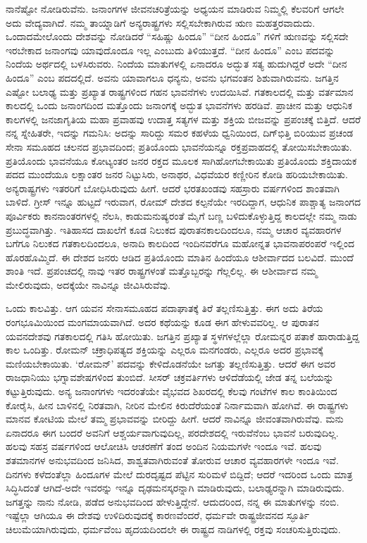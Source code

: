 ನಾನೆಷ್ಟೋ ನೋಡಿರುವೆನು. ಜನಾಂಗಗಳ ಜೀವನಚರಿತ್ರೆಯನ್ನು ಅಧ್ಯಯನ ಮಾಡಿರುವ ನಿಮ್ಮಲ್ಲಿ ಕೆಲವರಿಗೆ ಆಗಲೇ ಅದು ವೇದ್ಯವಾಗಿದೆ. ನಮ್ಮ ತಾಯ್ನಾಡಿಗೆ ಅನ್ಯರಾಷ್ಟ್ರಗಳು ಸಲ್ಲಿಸಬೇಕಾಗಿರುವ ಋಣ ಮಹತ್ತರವಾದುದು. ಒಂದಾದಮೇಲೊಂದು ದೇಶವನ್ನು ನೋಡಿದರೆ “ಸಹಿಷ್ಣು ಹಿಂದೂ” “ದೀನ ಹಿಂದೂ” ಗಳಿಗೆ ಋಣವನ್ನು ಸಲ್ಲಿಸದೇ ಇರಬೇಕಾದ ಜನಾಂಗವು ಯಾವುದೊಂದೂ ಇಲ್ಲ ಎಂಬುದು ತಿಳಿಯುತ್ತದೆ. “ದೀನ ಹಿಂದೂ” ಎಂಬ ಪದವನ್ನು ನಿಂದೆಯ ಅರ್ಥದಲ್ಲಿ ಬಳಸಿರುವರು. ನಿಂದೆಯ ಮಾತುಗಳಲ್ಲಿ ಏನಾದರೂ ಅದ್ಭುತ ಸತ್ಯ ಹುದುಗಿದ್ದರೆ ಅದೇ “ದೀನ ಹಿಂದೂ” ಎಂಬ ಪದದಲ್ಲಿದೆ. ಅವನು ಯಾವಾಗಲೂ ಧನ್ಯನು, ಅವನು ಭಗವಂತನ ಶಿಶುವಾಗಿರುವನು. ಜಗತ್ತಿನ ಎಷ್ಟೋ ಬಲಾಢ್ಯ ಮತ್ತು ಪ್ರಖ್ಯಾತ ರಾಷ್ಟ್ರಗಳಿಂದ ಗಹನ ಭಾವನೆಗಳು ಉದಯಿಸಿವೆ. ಗತಕಾಲದಲ್ಲಿ ಮತ್ತು ವರ್ತಮಾನ ಕಾಲದಲ್ಲಿ ಒಂದು ಜನಾಂಗದಿಂದ ಮತ್ತೊಂದು ಜನಾಂಗಕ್ಕೆ ಅದ್ಭುತ ಭಾವನೆಗಳು ಹರಡಿವೆ. ಪ್ರಾಚೀನ ಮತ್ತು ಆಧುನಿಕ ಕಾಲಗಳಲ್ಲಿ ಜನಜಾಗೃತಿಯ ಮಹಾ ಪ್ರವಾಹವು ಉದಾತ್ತ ಸತ್ಯಗಳ ಮತ್ತು ಶಕ್ತಿಯ ಬೀಜವನ್ನು ಪ್ರಪಂಚಕ್ಕೆ ಬಿತ್ತಿದೆ. ಆದರೆ ನನ್ನ ಸ್ನೇಹಿತರೇ, ಇದನ್ನು ಗಮನಿಸಿ: ಅದನ್ನು ಸಾರಿದ್ದು ಸಮರ ಕಹಳೆಯ ಧ್ವನಿಯಿಂದ, ದಿಗ್​ಭಿತ್ತಿ ಬಿರಿಯುವ ಪ್ರಚಂಡ ಸೇನಾ ಸಮೂಹದ ಚಲನದ ಪ್ರಭಾವದಿಂದ; ಪ್ರತಿಯೊಂದು ಭಾವನೆಯನ್ನೂ ರಕ್ತಪ್ರವಾಹದಲ್ಲಿ ತೋಯಿಸಬೇಕಾಯಿತು. ಪ್ರತಿಯೊಂದು ಭಾವನೆಯೂ ಕೋಟ್ಯಂತರ ಜನರ ರಕ್ತದ ಮೂಲಕ ಸಾಗಿಹೋಗಬೇಕಾಯಿತು ಪ್ರತಿಯೊಂದು ಶಕ್ತಿದಾಯಕ ಪದದ ಮುಂದೆಯೂ ಲಕ್ಷಾಂತರ ಜನರ ನಿಟ್ಟುಸಿರು, ಅನಾಥರ, ವಿಧವೆಯರ ಕಣ್ಣೀರಿನ ಕೋಡಿ ಹರಿಯಬೇಕಾಯಿತು. ಅನ್ಯರಾಷ್ಟ್ರಗಳು ಇತರರಿಗೆ ಬೋಧಿಸಿರುವುದು ಹೀಗೆ. ಆದರೆ ಭರತಖಂಡವು ಸಹಸ್ರಾರು ವರ್ಷಗಳಿಂದ ಶಾಂತವಾಗಿ ಬಾಳಿದೆ. ಗ್ರೀಸ್​ ಇನ್ನೂ ಹುಟ್ಟದೆ ಇರುವಾಗ, ರೋಮ್​ ದೇಶದ ಕಲ್ಪನೆಯೇ ಇರದಿದ್ದಾಗ, ಆಧುನಿಕ ಪಾಶ್ಚಾತ್ಯ ಜನಾಂಗದ ಪೂರ್ವಿಕರು ಕಾನನಾಂತರಗಳಲ್ಲಿ ನೆಲಸಿ, ಕಾಡುಮನುಷ್ಯರಂತೆ ಮೈಗೆ ಬಣ್ಣ ಬಳಿದುಕೊಳ್ಳುತ್ತಿದ್ದ ಕಾಲದಲ್ಲೇ ನಮ್ಮ ನಾಡು ಪ್ರಬುದ್ಧವಾಗಿತ್ತು. ಇತಿಹಾಸದ ದಾಖಲೆಗೆ ಕೂಡ ನಿಲುಕದ ಪುರಾತನಕಾಲದಿಂದಲೂ, ನಮ್ಮ ಆಚಾರ ವ್ಯವಹಾರಗಳ ಬಗೆಗೂ ನಿಲುಕದ ಗತಕಾಲದಿಂದಲೂ, ಅನಾದಿ ಕಾಲದಿಂದ ಇಂದಿನವರೆಗೂ ಮಹೋನ್ನತ ಭಾವನಾಪರಂಪರೆ ಇಲ್ಲಿಂದ ಹೊರಹೊಮ್ಮಿದೆ. ಈ ದೇಶದ ಜನರು ಆಡಿದ ಪ್ರತಿಯೊಂದು ಮಾತಿನ ಹಿಂದೆಯೂ ಆಶೀರ್ವಾದದ ಬಲವಿದೆ. ಮುಂದೆ ಶಾಂತಿ ಇದೆ. ಪ್ರಪಂಚದಲ್ಲಿ ನಾವು ಇತರ ರಾಷ್ಟ್ರಗಳಂತೆ ಮತ್ತೊಬ್ಬರನ್ನು ಗೆಲ್ಲಲಿಲ್ಲ. ಈ ಆಶೀರ್ವಾದ ನಮ್ಮ ಮೇಲಿರುವುದು, ಅದಕ್ಕೆಯೇ ನಾವಿನ್ನೂ ಜೀವಿಸಿರುವೆವು.

ಒಂದು ಕಾಲವಿತ್ತು. ಆಗ ಯವನ ಸೇನಾಸಮೂಹದ ಪದಾಘಾತಕ್ಕೆ ತಿರೆ ತಲ್ಲಣಿಸುತ್ತಿತ್ತು. ಈಗ ಅದು ತಿರೆಯ ರಂಗಭೂಮಿಯಿಂದ ಮಂಗಮಾಯವಾಗಿದೆ. ಅದರ ಕಥೆಯನ್ನು ಕೂಡ ಈಗ ಹೇಳುವವರಿಲ್ಲ. ಆ ಪುರಾತನ ಯವನದೇಶವು ಗತಕಾಲದಲ್ಲಿ ಗತಿಸಿ ಹೋಯಿತು. ಜಗತ್ತಿನ ಪ್ರಖ್ಯಾತ ಸ್ಥಳಗಳಲ್ಲೆಲ್ಲಾ ರೋಮನ್ನರ ಪತಾಕೆ ಹಾರಾಡುತ್ತಿದ್ದ ಕಾಲ ಒಂದಿತ್ತು. ರೋಮನ್​ ಚಕ್ರಾಧಿಪತ್ಯದ ಶಕ್ತಿಯನ್ನು ಎಲ್ಲರೂ ಮನಗಂಡರು, ಎಲ್ಲರೂ ಅದರ ಪ್ರಭಾವಕ್ಕೆ ಮಣಿಯಬೇಕಾಯಿತು. ‘ರೋಮನ್​’ ಪದವನ್ನು ಕೇಳಿದೊಡನೆಯೇ ಜಗತ್ತು ತಲ್ಲಣಿಸುತ್ತಿತ್ತು. ಆದರೆ ಈಗ ಅವರ ರಾಜಧಾನಿಯು ಭಗ್ನಾವಶೇಷಗಳಿಂದ ತುಂಬಿದೆ. ಸೀಸರ್​ ಚಕ್ರವರ್ತಿಗಳು ಆಳಿದೆಡೆಯಲ್ಲಿ ಜೇಡ ತನ್ನ ಬಲೆಯನ್ನು ಕಟ್ಟುತ್ತಿರುವುದು. ಅನ್ಯ ಜನಾಂಗಗಳು ಇದರಂತೆಯೇ ವೈಭವದ ಶಿಖರದಲ್ಲಿ ಕೆಲವು ಗಂಟೆಗಳ ಕಾಲ ಕಾಂತಿಯಿಂದ ಕೋರೈಸಿ, ಹೀನ ಬಾಳಿನಲ್ಲಿ ನಿರತವಾಗಿ, ನೀರಿನ ಮೇಲಿನ ಕಿರುದೆರೆಯಂತೆ ನಿರ್ನಾಮವಾಗಿ ಹೋಗಿವೆ. ಈ ರಾಷ್ಟ್ರಗಳು ಮಾನವ ಕೋಟಿಯ ಮೇಲೆ ತಮ್ಮ ಪ್ರಭಾವವನ್ನು ಬೀರಿದ್ದು ಹೀಗೆ. ಆದರೆ ನಾವಿನ್ನೂ ಜೀವಂತವಾಗಿರುವೆವು. ಮನು ಏನಾದರೂ ಈಗ ಬಂದರೆ ಅವನಿಗೆ ಆಶ್ಚರ್ಯವಾಗುವುದಿಲ್ಲ, ಪರದೇಶದಲ್ಲಿ ಇರುವೆನೆಂಬ ಭಾವನೆ ಬರುವುದಿಲ್ಲ. ಹಲವು ಸಹಸ್ರ ವರ್ಷಗಳಿಂದ ಆಲೋಚಿಸಿ ಆಚರಣೆಗೆ ತಂದ ಅಂದಿನ ನಿಯಮಗಳೇ ಇಂದೂ ಇವೆ. ಹಲವು ಶತಮಾನಗಳ ಅನುಭವದಿಂದ ಜನಿಸಿದ, ಶಾಶ್ವತವಾಗಿರುವಂತೆ ತೋರುವ ಆಚಾರ ವ್ಯವಹಾರಗಳೇ ಇಂದೂ ಇವೆ. ದಿನಗಳು ಕಳೆದಂತೆಲ್ಲಾ ಹಿಂದೂಗಳ ಮೇಲೆ ದುರದೃಷ್ಟದ ಪೆಟ್ಟಿನ ಸುರಿಮಳೆ ಬಿದ್ದಿದೆ; ಆದರೆ ಇದರಿಂದ ಒಂದು ಮಾತ್ರ ಸಿದ್ಧಿಸಿದಂತೆ ಆಗಿದೆ-ಅದೇ ಇವರನ್ನು ಇನ್ನೂ ದೃಢಮನಸ್ಕರನ್ನಾಗಿ ಮಾಡಿರುವುದು, ಬಲಾಢ್ಯರನ್ನಾಗಿ ಮಾಡಿರುವುದು. ಜಗತ್ತನ್ನು ನಾನು ನೋಡಿ, ಪಡೆದ ಅನುಭವದಿಂದ ಹೇಳುತ್ತಿದ್ದೇನೆ. ಆದುದರಿಂದ, ನನ್ನ ಈ ಮಾತುಗಳನ್ನು ನಂಬಿ. ಇಷ್ಟೆಲ್ಲಾ ಆಗಿಯೂ ಈ ದೇಶವು ಉಳಿದಿರುವುದಕ್ಕೆ ಕಾರಣವೆಂದರೆ, ಧರ್ಮವೇ ರಾಷ್ಟ್ರಜೀವನದ ಸ್ಫೂರ್ತಿ ಚಿಲುಮೆಯಾಗಿರುವುದು, ಧರ್ಮವೆಂಬ ಹೃದಯದಿಂದಲೇ ಈ ರಾಷ್ಟ್ರದ ನಾಡಿಗಳಲ್ಲಿ ರಕ್ತವು ಸಂಚರಿಸುತ್ತಿರುವುದು.

